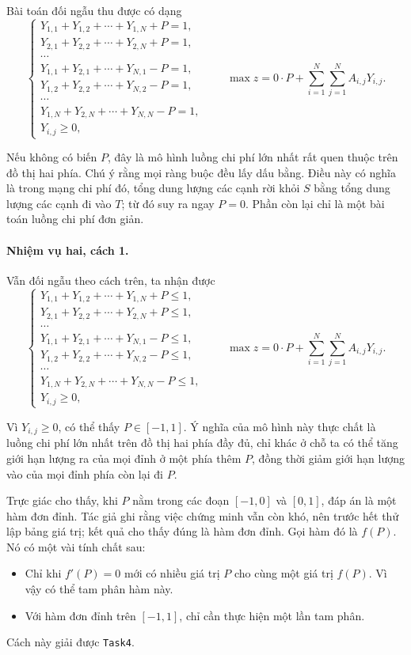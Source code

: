 \documentclass[11pt]{article}
\begin{document}
Bài toán đối ngẫu thu được có dạng
\[
\begin{cases}
Y_{1,1}+Y_{1,2}+\cdots+Y_{1,N}+P=1,\\
Y_{2,1}+Y_{2,2}+\cdots+Y_{2,N}+P=1,\\
\cdots\\
Y_{1,1}+Y_{2,1}+\cdots+Y_{N,1}-P=1,\\
Y_{1,2}+Y_{2,2}+\cdots+Y_{N,2}-P=1,\\
\cdots\\
Y_{1,N}+Y_{2,N}+\cdots+Y_{N,N}-P=1,\\
Y_{i,j}\ge0,
\end{cases}
\qquad
\max z=0\cdot P+\sum_{i=1}^{N}\sum_{j=1}^{N}A_{i,j}Y_{i,j}.
\]

Nếu không có biến \(P\), đây là mô hình luồng chi phí lớn nhất rất quen thuộc
trên đồ thị hai phía. Chú ý rằng mọi ràng buộc đều lấy dấu bằng. Điều này có
nghĩa là trong mạng chi phí đó, tổng dung lượng các cạnh rời khỏi \(S\) bằng
tổng dung lượng các cạnh đi vào \(T\); từ đó suy ra ngay \(P=0\). Phần còn lại
chỉ là một bài toán luồng chi phí đơn giản.

\paragraph{Nhiệm vụ hai, cách 1.}
Vẫn đối ngẫu theo cách trên, ta nhận được
\[
\begin{cases}
Y_{1,1}+Y_{1,2}+\cdots+Y_{1,N}+P\le1,\\
Y_{2,1}+Y_{2,2}+\cdots+Y_{2,N}+P\le1,\\
\cdots\\
Y_{1,1}+Y_{2,1}+\cdots+Y_{N,1}-P\le1,\\
Y_{1,2}+Y_{2,2}+\cdots+Y_{N,2}-P\le1,\\
\cdots\\
Y_{1,N}+Y_{2,N}+\cdots+Y_{N,N}-P\le1,\\
Y_{i,j}\ge0,
\end{cases}
\qquad
\max z=0\cdot P+\sum_{i=1}^{N}\sum_{j=1}^{N}A_{i,j}Y_{i,j}.
\]

Vì \(Y_{i,j}\ge0\), có thể thấy \(P\in[-1,1]\). Ý nghĩa của mô hình này thực
chất là luồng chi phí lớn nhất trên đồ thị hai phía đầy đủ, chỉ khác ở chỗ ta
có thể tăng giới hạn lượng ra của mọi đỉnh ở một phía thêm \(P\), đồng thời
giảm giới hạn lượng vào của mọi đỉnh phía còn lại đi \(P\).

Trực giác cho thấy, khi \(P\) nằm trong các đoạn \([-1,0]\) và \([0,1]\), đáp án
là một hàm đơn đỉnh. Tác giả ghi rằng việc chứng minh vẫn còn khó, nên trước hết
thử lập bảng giá trị; kết quả cho thấy đúng là hàm đơn đỉnh. Gọi hàm đó là
\(f(P)\). Nó có một vài tính chất sau:
\begin{itemize}
  \item Chỉ khi \(f'(P)=0\) mới có nhiều giá trị \(P\) cho cùng một giá trị
  \(f(P)\). Vì vậy có thể tam phân hàm này.
  \item Với hàm đơn đỉnh trên \([-1,1]\), chỉ cần thực hiện một lần tam phân.
\end{itemize}
Cách này giải được \texttt{Task4}.
\end{document}
